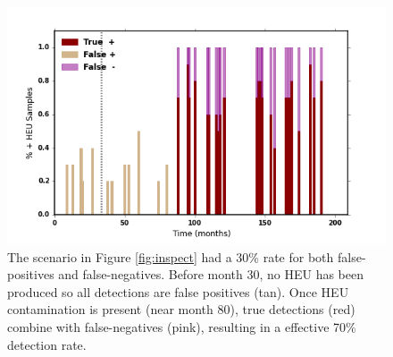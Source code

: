 \begin{figure}%
\begin{center}
\includegraphics[natwidth=162bp,natheight=227bp, scale=0.6]{./figs/mm_5enrich_tinytails_inspswipe_rates.png}
\end{center}
\caption{The scenario in Figure \ref{fig:inspect} had a 30\% rate for both false-positives and false-negatives. Before month 30, no HEU has been produced so all detections are false positives (tan). Once \gls{HEU} contamination is present (near month 80), true detections (red) combine with false-negatives (pink), resulting in a effective 70\% detection rate.}
\label{fig:false_inspect}
\end{figure}
